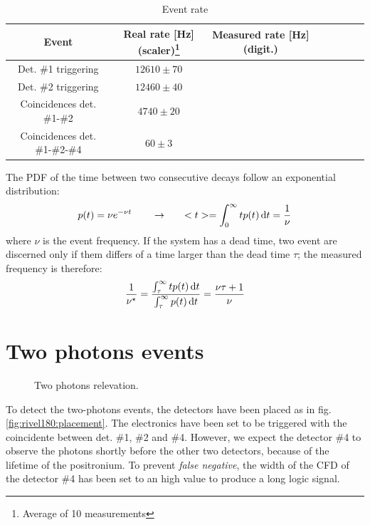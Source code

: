 \documentclass[11pt,a4 paper]{article}
\let\oldfrac\frac
\renewcommand{\frac}[3][d]{\ifthenelse{\equal{#1}{d}}{\oldfrac{#2}{#3}}{\nicefrac{#2}{#3}}}
\begin{document}
\begin{table}[H]
    \centering
    \begin{tabular}{cccccccc}
        \toprule
        Event & Real rate [\si{Hz}] (scaler)\footnote{Average of 10 measurements} & Measured rate [\si{Hz}] (digit.) \\
        \midrule
        Det. \#1 triggering & $12610 \pm 70$ & \\
        Det. \#2 triggering & $12460 \pm 40$ & \\
        Coincidences det. \#1-\#2 & $4740 \pm 20$ & \\
        Coincidences det. \#1-\#2-\#4 & $60 \pm 3$ & \\
        \bottomrule
    \end{tabular}
    \caption{Event rate}
    \label{tab:rate}
\end{table}

The PDF of the time between two consecutive decays follow an exponential distribution:
\begin{equation*}
    p(t) = \nu e^{-\nu t} \qquad \rightarrow \qquad <t> = \int_0^{\infty} tp(t) \dd{t} = \frac{1}{\nu}
\end{equation*}
where $\nu$ is the event frequency. If the system has a dead time, two event are discerned only if them differs of a time larger than the dead time $\tau$; the measured frequency is therefore:
\begin{equation*}
    \frac{1}{\nu^\star} = \frac{\int_{\tau}^{\infty} t p(t) \dd{t}}{\int_{\tau}^{\infty} p(t) \dd{t}} =\frac{\nu\tau + 1}{\nu}
\end{equation*}

\section{Two photons events}

\begin{figure}[H]
    \centering
     \quad
    \caption{Two photons relevation.}
    \label{fig:rivel180}
\end{figure}

To detect the two-photons events, the detectors have been placed as in fig. \ref{fig:rivel180:placement}. The electronics have been set to be triggered with the coincidente between det. \#1, \#2 and \#4. However, we expect the detector \#4 to observe the photons shortly before the other two detectors, because of the lifetime of the positronium. To prevent \emph{false negative}, the width of the CFD of the detector \#4 has been set to an high value to produce a long logic signal.
\end{document}

